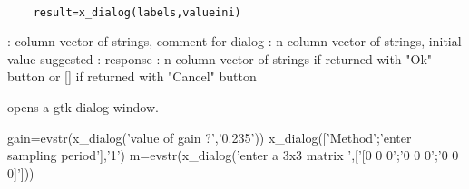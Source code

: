 
\begin{mandesc}
  \\ %
\end{mandesc}
\label{x-dialog}
\begin{calling_sequence}
  \begin{verbatim}
    result=x_dialog(labels,valueini)   
  \end{verbatim}
\end{calling_sequence}
\begin{parameters}
  \begin{varlist}
     : column vector of strings, comment for dialog
     : n column vector of strings, initial value suggested
     : response : n column vector of strings if returned with "Ok" button or [] if returned with "Cancel" button
  \end{varlist}
\end{parameters}
\begin{mandescription}
  opens a gtk dialog window.
\end{mandescription}
\begin{examples}
  \begin{program}
    gain=evstr(x_dialog('value of gain ?','0.235'))
    x_dialog(['Method';'enter sampling period'],'1')
    m=evstr(x_dialog('enter a  3x3 matrix ',['[0 0 0';'0 0 0';'0 0 0]']))
  \end{program}
\end{examples}
\begin{manseealso}
       
\end{manseealso}

